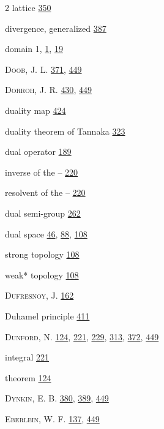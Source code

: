 \begin{multicols}{2}
\hspace*{1.1em}lattice \hyperlink{page.350}{350}\par
\noindent divergence, generalized \hyperlink{page.387}{387}\par
\noindent domain 1, \hyperlink{page.1}{1}, \hyperlink{page.19}{19}\par
\noindent \textsc{Doob}, J. L. \hyperlink{page.371}{371}, \hyperlink{page.449}{449}\par
\noindent \textsc{Dorroh}, J. R. \hyperlink{page.430}{430}, \hyperlink{page.449}{449}\par
\noindent duality map \hyperlink{page.424}{424}\par
\noindent duality theorem of Tannaka \hyperlink{page.323}{323}\par
\noindent dual operator \hyperlink{page.189}{189}\par
\hspace*{1.1em}inverse of the -- \hyperlink{page.220}{220}\par
\hspace*{1.1em}resolvent of the -- \hyperlink{page.220}{220}\par
\noindent dual semi-group \hyperlink{page.262}{262}\par
\noindent dual space \hyperlink{page.46}{46}, \hyperlink{page.88}{88}, \hyperlink{page.108}{108}\par
\hspace*{1.1em}strong topology \hyperlink{page.108}{108}\par
\hspace*{1.1em}weak* topology \hyperlink{page.108}{108}\par
\noindent \textsc{Dufresnoy}, J. \hyperlink{page.162}{162}\par
\noindent Duhamel principle \hyperlink{page.411}{411}\par
\noindent \textsc{Dunford}, N. \hyperlink{page.124}{124}, \hyperlink{page.221}{221}, \hyperlink{page.229}{229}, \hyperlink{page.313}{313}, \hyperlink{page.372}{372}, \hyperlink{page.449}{449}\par
\hspace*{1.1em}integral \hyperlink{page.221}{221}\par
\hspace*{1.1em}theorem \hyperlink{page.124}{124}\par
\noindent \textsc{Dynkin}, E. B. \hyperlink{page.380}{380}, \hyperlink{page.389}{389}, \hyperlink{page.449}{449}\par
\noindent \textsc{Eberlein}, W. F. \hyperlink{page.137}{137}, \hyperlink{page.449}{449}\par

\end{multicols}
